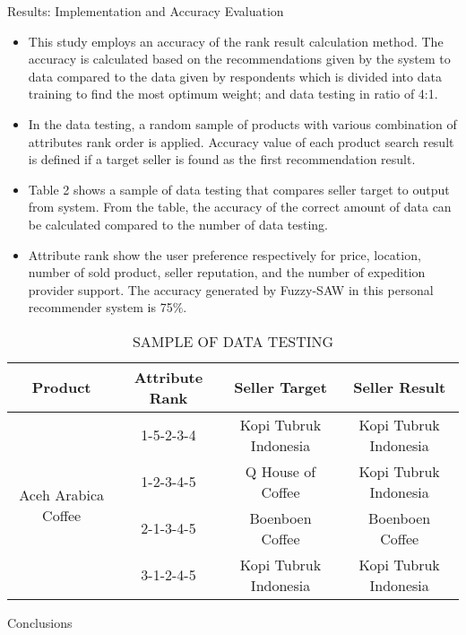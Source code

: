 \documentclass[final,hyperref={pdfpagelabels=false}]{beamer}
\begin{document}
\begin{frame}[t]
\begin{columns}[t]
\begin{column}{.465\textwidth}
\begin{block}{Results: Implementation and Accuracy Evaluation}
\begin{itemize}
\begin{itemize}
\item This study employs an accuracy of the rank result calculation method. The accuracy is calculated based on the recommendations given by the system to data compared to the data given by respondents which is divided into data training to find the most optimum weight; and data testing in ratio of 4:1. 
\item In the data testing, a random sample of products with various combination of attributes rank order is applied. Accuracy value of each product search result is defined if a target seller is found as the first recommendation result.
\item Table 2 shows a sample of data testing that compares seller target to output from system. From the table, the accuracy of the correct amount of data can be calculated compared to the number of data testing.
\item Attribute rank show the user preference respectively for price, location, number of sold product, seller reputation, and the number of expedition provider support. The accuracy generated by Fuzzy-SAW in this personal recommender system is 75\%.
\end{itemize}

\begin{table}[h!]
\scriptsize
\centering
\caption{SAMPLE OF DATA TESTING}
\begin{center}
\begin{tabular}{ |c|c|c|c| } 
\hline
Product & Attribute Rank & Seller Target & Seller Result \\
  \hline
  \multirow{4}{4em}{Aceh Arabica Coffee} 
  & 1-5-2-3-4 & Kopi Tubruk Indonesia & Kopi Tubruk Indonesia \\ 
  & 1-2-3-4-5 & Q House of Coffee & Kopi Tubruk Indonesia \\ 
  & 2-1-3-4-5 & Boenboen Coffee & Boenboen Coffee \\ 
  & 3-1-2-4-5 & Kopi Tubruk Indonesia & Kopi Tubruk Indonesia \\
  \hline
\end{tabular}
\end{center}
\end{table}

\end{itemize}


\end{block}
\begin{block}{Conclusions}

\begin{itemize}


\end{itemize}
\end{block}
\end{column}
\end{columns}
\end{frame}
\end{document}
